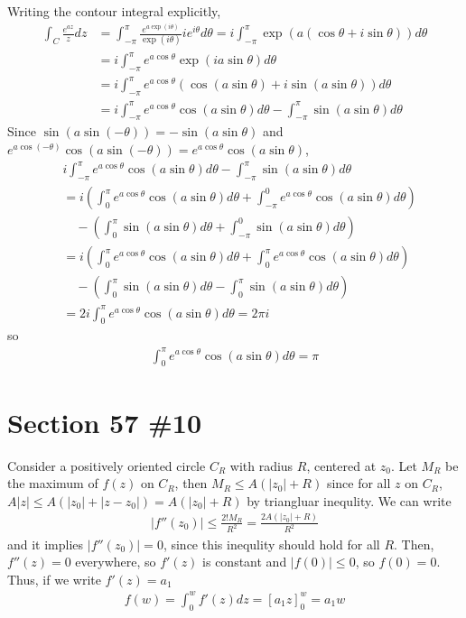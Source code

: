 \documentclass{scrartcl}
\begin{document}
Writing the contour integral explicitly,
\begin{align*}
  \int_C \frac{e^{az}}{z} dz &= \int^\pi_{-\pi} \frac{e^{a\exp(i\theta)}}{\exp(i\theta)} ie^{i\theta} d\theta = i \int^\pi_{-\pi} \exp(a(\cos \theta + i \sin \theta)) d\theta \\
                             &= i \int^\pi_{-\pi} e^{a\cos \theta} \exp(i a \sin \theta) d\theta \\
                             &= i \int^\pi_{-\pi} e^{a\cos \theta} (\cos(a \sin \theta) + i\sin (a \sin \theta)) d\theta \\
                             &= i \int^\pi_{-\pi} e^{a\cos \theta} \cos (a \sin \theta) d\theta - \int^\pi_{-\pi} \sin (a \sin \theta) d\theta
\end{align*}
Since \(\sin(a \sin (-\theta)) = -\sin (a \sin \theta)\) and \(e^{a \cos (-\theta)} \cos (a \sin (-\theta)) = e^{a \cos \theta} \cos (a \sin \theta)\),
\begin{align*}
  &i \int^\pi_{-\pi} e^{a\cos \theta} \cos (a \sin \theta) d\theta - \int^\pi_{-\pi} \sin (a \sin \theta) d\theta \\
  &= i \left( \int^\pi_0 e^{a\cos \theta} \cos (a \sin \theta) d\theta + \int^0_{-\pi} e^{a\cos \theta} \cos (a \sin \theta) d\theta \right) \\
  &\quad - \left( \int^\pi_0 \sin (a \sin \theta) d\theta + \int^0_{-\pi} \sin (a \sin \theta) d\theta \right) \\
  &= i \left( \int^\pi_0 e^{a\cos \theta} \cos (a \sin \theta) d\theta + \int^\pi_0 e^{a\cos \theta} \cos (a \sin \theta) d\theta \right) \\
  &\quad - \left( \int^\pi_0 \sin (a \sin \theta) d\theta - \int^\pi_0 \sin (a \sin \theta) d\theta \right) \\
  &= 2i \int^\pi_0 e^{a\cos \theta} \cos (a \sin \theta) d\theta = 2\pi i
\end{align*}
so
\begin{align*}
  \int^\pi_0 e^{a \cos \theta} \cos (a \sin \theta) d\theta = \pi
\end{align*}

\section{Section 57 \#10}
Consider a positively oriented circle \(C_R\) with radius \(R\), centered at \(z_0\).
Let \(M_R\) be the maximum of \(f(z)\) on \(C_R\), then \(M_R \leq A(|z_0| + R)\) since for all \(z\) on \(C_R\), \(A|z| \leq A(|z_0| + |z - z_0|) = A(|z_0| + R)\) by triangluar inequlity.
We can write
\begin{align*}
  |f''(z_0)| \leq \frac{2! M_R}{R^2} = \frac{2A(|z_0| + R)}{R^2}
\end{align*}
and it implies \(|f''(z_0)| = 0\), since this inequlity should hold for all \(R\).
Then, \(f''(z) = 0\) everywhere, so \(f'(z)\) is constant and \(|f(0)| \leq 0\), so \(f(0) = 0\).
Thus, if we write \(f'(z) = a_1\)
\begin{align*}
  f(w) = \int^w_0 f'(z) dz = \left[ a_1 z \right]^w_0 = a_1 w
\end{align*}
\end{document}
